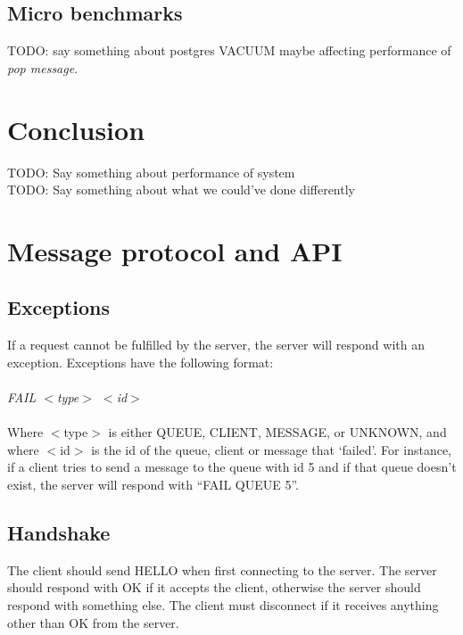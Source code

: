 \documentclass{article}
\begin{document}
        \subsection{Micro benchmarks}
            TODO: say something about postgres VACUUM maybe affecting performance of \textit{pop message}.

    \section{Conclusion}
        TODO: Say something about performance of system\\
        TODO: Say something about what we could've done differently
    \clearpage
    \appendix
        \section{Message protocol and API}
        \label{sec:message_protocol_api}
            \subsection{Exceptions}
                If a request cannot be fulfilled by the server, the server will respond with an exception.  Exceptions have the following format:\\
                \\
                \indent\textit{FAIL $<$type$>$ $<$id$>$}\\
                \\
                Where $<$type$>$ is either QUEUE, CLIENT, MESSAGE, or UNKNOWN, and where $<$id$>$ is the id of the queue, client or message that ‘failed’. For instance, if a client tries to send a message to the queue with id 5 and if that queue doesn’t exist, the server will respond with “FAIL QUEUE 5”.

            \subsection{Handshake}
                The client should send HELLO when first connecting to the server. The server should respond with OK if it accepts the client, otherwise the server should respond with something else. The client must disconnect if it receives anything other than OK from the server.
\end{document}
